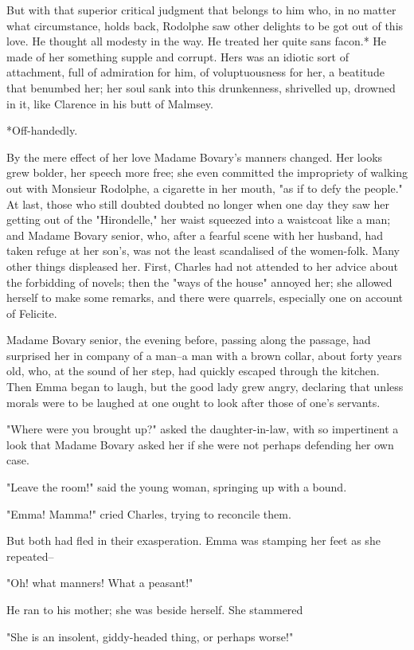 \documentclass{tufte-book}
\begin{document}
But with that superior critical judgment that belongs to him who, in no
matter what circumstance, holds back, Rodolphe saw other delights to be
got out of this love. He thought all modesty in the way. He treated her
quite sans facon.* He made of her something supple and corrupt. Hers
was an idiotic sort of attachment, full of admiration for him, of
voluptuousness for her, a beatitude that benumbed her; her soul sank
into this drunkenness, shrivelled up, drowned in it, like Clarence in
his butt of Malmsey.

     *Off-handedly.


By the mere effect of her love Madame Bovary's manners changed.
Her looks grew bolder, her speech more free; she even committed the
impropriety of walking out with Monsieur Rodolphe, a cigarette in her
mouth, "as if to defy the people." At last, those who still doubted
doubted no longer when one day they saw her getting out of the
"Hirondelle," her waist squeezed into a waistcoat like a man; and Madame
Bovary senior, who, after a fearful scene with her husband, had taken
refuge at her son's, was not the least scandalised of the women-folk.
Many other things displeased her. First, Charles had not attended to
her advice about the forbidding of novels; then the "ways of the house"
annoyed her; she allowed herself to make some remarks, and there were
quarrels, especially one on account of Felicite.

Madame Bovary senior, the evening before, passing along the passage,
had surprised her in company of a man--a man with a brown collar, about
forty years old, who, at the sound of her step, had quickly escaped
through the kitchen. Then Emma began to laugh, but the good lady grew
angry, declaring that unless morals were to be laughed at one ought to
look after those of one's servants.

"Where were you brought up?" asked the daughter-in-law, with so
impertinent a look that Madame Bovary asked her if she were not perhaps
defending her own case.

"Leave the room!" said the young woman, springing up with a bound.

"Emma! Mamma!" cried Charles, trying to reconcile them.

But both had fled in their exasperation. Emma was stamping her feet as
she repeated--

"Oh! what manners! What a peasant!"

He ran to his mother; she was beside herself. She stammered

"She is an insolent, giddy-headed thing, or perhaps worse!"
\end{document}
